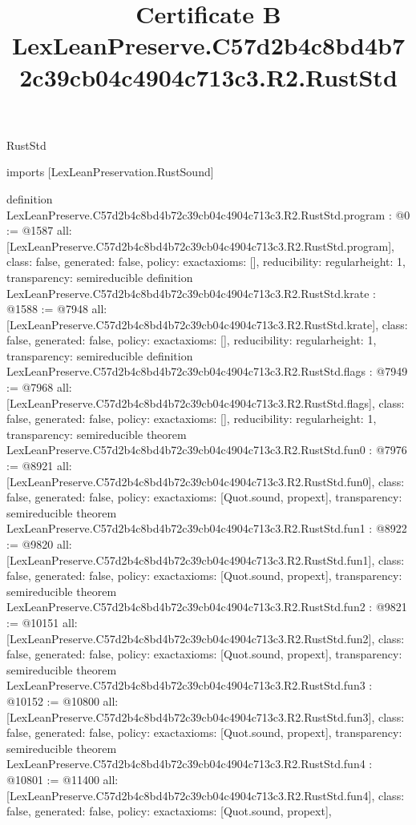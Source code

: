 \begin{lexlean}{RustStd}
\title{Certificate B LexLeanPreserve.C57d2b4c8bd4b72c39cb04c4904c713c3.R2.RustStd}
\begin{coremodule}
imports [LexLeanPreservation.RustSound]

definition LexLeanPreserve.C57d2b4c8bd4b72c39cb04c4904c713c3.R2.RustStd.program : @0 := @1587 {
  all: [LexLeanPreserve.C57d2b4c8bd4b72c39cb04c4904c713c3.R2.RustStd.program],
  class: false,
  generated: false,
  policy: exact{axioms: []},
  reducibility: regular{height: 1},
  transparency: semireducible
}
definition LexLeanPreserve.C57d2b4c8bd4b72c39cb04c4904c713c3.R2.RustStd.krate : @1588 := @7948 {
  all: [LexLeanPreserve.C57d2b4c8bd4b72c39cb04c4904c713c3.R2.RustStd.krate],
  class: false,
  generated: false,
  policy: exact{axioms: []},
  reducibility: regular{height: 1},
  transparency: semireducible
}
definition LexLeanPreserve.C57d2b4c8bd4b72c39cb04c4904c713c3.R2.RustStd.flags : @7949 := @7968 {
  all: [LexLeanPreserve.C57d2b4c8bd4b72c39cb04c4904c713c3.R2.RustStd.flags],
  class: false,
  generated: false,
  policy: exact{axioms: []},
  reducibility: regular{height: 1},
  transparency: semireducible
}
theorem LexLeanPreserve.C57d2b4c8bd4b72c39cb04c4904c713c3.R2.RustStd.fun0 : @7976 := @8921 {
  all: [LexLeanPreserve.C57d2b4c8bd4b72c39cb04c4904c713c3.R2.RustStd.fun0],
  class: false,
  generated: false,
  policy: exact{axioms: [Quot.sound, propext]},
  transparency: semireducible
}
theorem LexLeanPreserve.C57d2b4c8bd4b72c39cb04c4904c713c3.R2.RustStd.fun1 : @8922 := @9820 {
  all: [LexLeanPreserve.C57d2b4c8bd4b72c39cb04c4904c713c3.R2.RustStd.fun1],
  class: false,
  generated: false,
  policy: exact{axioms: [Quot.sound, propext]},
  transparency: semireducible
}
theorem LexLeanPreserve.C57d2b4c8bd4b72c39cb04c4904c713c3.R2.RustStd.fun2 : @9821 := @10151 {
  all: [LexLeanPreserve.C57d2b4c8bd4b72c39cb04c4904c713c3.R2.RustStd.fun2],
  class: false,
  generated: false,
  policy: exact{axioms: [Quot.sound, propext]},
  transparency: semireducible
}
theorem LexLeanPreserve.C57d2b4c8bd4b72c39cb04c4904c713c3.R2.RustStd.fun3 : @10152 := @10800 {
  all: [LexLeanPreserve.C57d2b4c8bd4b72c39cb04c4904c713c3.R2.RustStd.fun3],
  class: false,
  generated: false,
  policy: exact{axioms: [Quot.sound, propext]},
  transparency: semireducible
}
theorem LexLeanPreserve.C57d2b4c8bd4b72c39cb04c4904c713c3.R2.RustStd.fun4 : @10801 := @11400 {
  all: [LexLeanPreserve.C57d2b4c8bd4b72c39cb04c4904c713c3.R2.RustStd.fun4],
  class: false,
  generated: false,
  policy: exact{axioms: [Quot.sound, propext]},
}
\end{coremodule}
\end{lexlean}
